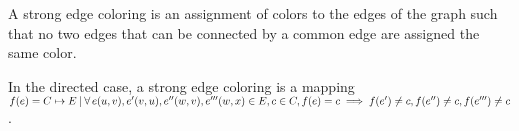\begin{defi}

A strong edge coloring is an assignment of colors to the edges of the graph such that no two edges that can be connected by a common edge are assigned the same color. 

In the directed case, a strong edge coloring is a mapping $f(e) = C \mapsto E {\: |\:} \forall\, e(u,v), e'(v,u), e''(w,v), e'''(w,x) \in E, c \in C, f(e) = c \implies f(e') \ne c, f(e'') \ne c, f(e''') \ne c$.  
\end{defi}

